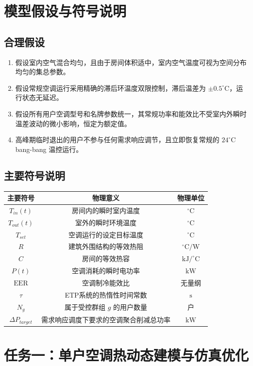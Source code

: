\documentclass[12pt,a4paper]{article}
\begin{document}
\section{模型假设与符号说明}
\subsection{合理假设}
\begin{enumerate}
    \item 假设室内空气混合均匀，且由于房间体积适中，室内空气温度可视为空间分布均匀的集总参数。
    \item 假设常规空调运行采用精确的滞后环温度双限控制，滞后温差为 $\pm 0.5^\circ\text{C}$，运行状态无延迟。
    \item 假设所有用户空调型号和名牌参数统一，其常规功率和能效比不受室内外瞬时温差波动的微小影响，恒定为额定值。
    \item 高峰期临时退出的用户不参与任何需求响应调节，且立即恢复常规的 $24^\circ\text{C}$ bang-bang 温控运行。
\end{enumerate}

\subsection{主要符号说明}
\begin{longtable}{ccc}
    \toprule
    \textbf{主要符号} & \textbf{物理意义} & \textbf{物理单位} \\ \midrule
    $T_{in}(t)$ & 房间内的瞬时室内温度 & $^\circ\text{C}$ \\
    $T_{out}(t)$ & 室外的瞬时环境温度 & $^\circ\text{C}$ \\
    $T_{set}$ & 空调运行的设定目标温度 & $^\circ\text{C}$ \\
    $R$ & 建筑外围结构的等效热阻 & $^\circ\text{C}/\text{W}$ \\
    $C$ & 房间的等效热容 & $\text{kJ}/^\circ\text{C}$ \\
    $P(t)$ & 空调消耗的瞬时电功率 & $\text{kW}$ \\
    $\text{EER}$ & 空调制冷能效比 & 无量纲 \\
    $\tau$ & ETP系统的热惰性时间常数 & $\text{s}$ \\
    $N_g$ & 属于受控群组 $g$ 的用户数量 & 户 \\
    $\Delta P_{target}$ & 需求响应调度下要求的空调聚合削减总功率 & $\text{kW}$ \\
    \bottomrule
\end{longtable}

\section{任务一：单户空调热动态建模与仿真优化}
\end{document}
